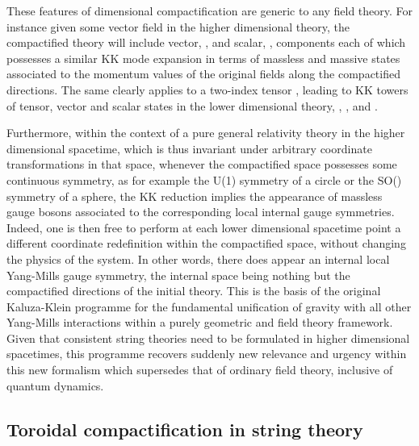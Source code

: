 \documentclass[a4paper,11pt]{article}
\begin{document}
These features of dimensional compactification are generic to any field
theory. For instance given some vector field \coordHE{} in the higher 
dimensional theory, the compactified theory will include vector, \coordHE{}, 
and scalar, \myHighlight{$\phi$}\coordHE{}, components each of which possesses a similar KK mode
expansion in terms of massless and massive states associated to the
momentum values of the original fields along the compactified directions.
The same clearly applies to a two-index tensor \coordHE{}, leading
to KK towers of tensor, vector and scalar states in the lower dimensional
theory, \coordHE{}, \coordHE{}, \coordHE{} and \myHighlight{$\phi$}\coordHE{}.

Furthermore, within the context of a pure general relativity theory in the
higher dimensional spacetime, which is thus invariant under arbitrary 
coordinate transformations in that space, whenever the compactified space 
possesses some continuous symmetry, as for example the U(1) symmetry of a 
circle or the SO(\coordHE{}) symmetry of a sphere, the KK reduction implies the 
appearance of massless gauge bosons associated to the corresponding local 
internal gauge symmetries. Indeed, one is then free to perform at each
lower dimensional spacetime point a different coordinate redefinition
within the compactified space, without changing the physics of the system.
In other words, there does appear an internal local Yang-Mills gauge symmetry,
the internal space being nothing but the compactified directions of the
initial theory. This is the basis of the original Kaluza-Klein programme
for the fundamental unification of gravity with all other Yang-Mills
interactions within a purely geometric and field theory framework. Given that
consistent string theories need to be formulated in higher dimensional
spacetimes, this programme recovers suddenly new relevance and
urgency within this new formalism which supersedes that of ordinary
field theory, inclusive of quantum dynamics.

\subsection{Toroidal compactification in string theory}
\label{Subsect8.2}
\end{document}
